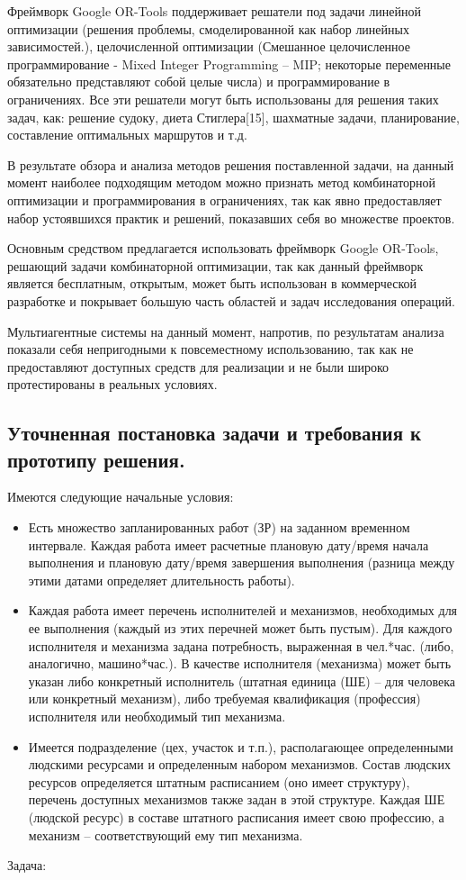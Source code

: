 Фреймворк Google OR-Tools поддерживает решатели под задачи линейной оптимизации (решения проблемы, смоделированной как набор линейных зависимостей.), целочисленной оптимизации (Смешанное целочисленное программирование - Mixed Integer Programming – MIP; некоторые переменные обязательно представляют собой целые числа) и программирование в ограничениях. Все эти решатели могут быть использованы для решения таких задач, как: решение судоку, диета Стиглера[15], шахматные задачи, планирование, составление оптимальных маршрутов и т.д.

В результате обзора и анализа методов решения поставленной задачи, на данный момент наиболее подходящим методом можно признать метод комбинаторной оптимизации и программирования в ограничениях, так как явно предоставляет набор устоявшихся практик и решений, показавших себя во множестве проектов.

Основным средством предлагается использовать фреймворк Google OR-Tools, решающий задачи комбинаторной оптимизации, так как данный фреймворк является бесплатным, открытым, может быть использован в коммерческой разработке и покрывает большую часть областей и задач исследования операций.

Мультиагентные системы на данный момент, напротив, по результатам анализа показали себя непригодными к повсеместному использованию, так как не предоставляют доступных средств для реализации и не были широко протестированы в реальных условиях.


\subsection{Уточненная постановка задачи и требования к прототипу решения.}
Имеются следующие начальные условия:
\begin{itemize}
	\item Есть множество запланированных работ (ЗР) на заданном временном интервале. Каждая работа имеет расчетные плановую дату/время начала выполнения и плановую дату/время завершения выполнения (разница между этими датами определяет длительность работы).
	\item Каждая работа имеет перечень исполнителей и механизмов, необходимых для ее выполнения (каждый из этих перечней может быть пустым). Для каждого исполнителя и механизма задана потребность, выраженная в чел.*час. (либо, аналогично, машино*час.).  В качестве исполнителя (механизма) может быть указан либо конкретный исполнитель (штатная единица (ШЕ) – для человека или конкретный механизм), либо требуемая квалификация (профессия) исполнителя или необходимый тип механизма.
	\item Имеется подразделение (цех, участок и т.п.), располагающее определенными людскими ресурсами и определенным набором механизмов. Состав людских ресурсов определяется штатным расписанием (оно имеет структуру), перечень доступных механизмов также задан в этой структуре. Каждая ШЕ (людской ресурс) в составе штатного расписания имеет свою профессию, а механизм – соответствующий ему тип механизма.
\end{itemize}
	Задача:
	
